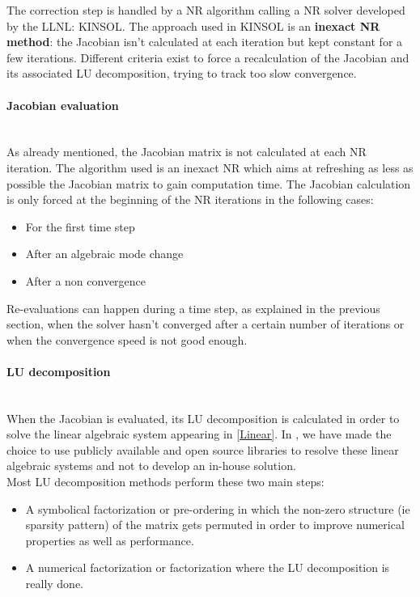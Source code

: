 \documentclass[a4paper, 12pt]{report}
\begin{document}
The correction step is handled by a \ac{NR} algorithm calling a \ac{NR} solver developed by the \ac{LLNL}: \ac{KINSOL}. The approach used in \ac{KINSOL} is an \textbf{inexact \ac{NR} method}: the Jacobian isn't calculated at each iteration but kept constant for a few iterations. Different criteria exist to force a recalculation of the Jacobian and its associated LU decomposition, trying to track too slow convergence.

\paragraph{Jacobian evaluation}
~~\\

As already mentioned, the Jacobian matrix is not calculated at each \ac{NR} iteration. The algorithm used is an inexact \ac{NR} which aims at refreshing as less as possible the Jacobian matrix to gain computation time. The Jacobian calculation is only forced at the beginning of the \ac{NR} iterations in the following cases:
\begin{itemize}
\item For the first time step
\item After an algebraic mode change
\item After a non convergence
\end{itemize}

Re-evaluations can happen during a time step, as explained in the previous section, when the solver hasn't converged after a certain number of iterations or when the convergence speed is not good enough.

\paragraph{LU decomposition}
~~\\

When the Jacobian is evaluated, its LU decomposition is calculated in order to solve the linear algebraic system appearing in \eqref{Linear}. In \Dynawo , we have made the choice to use publicly available and open source libraries to resolve these linear algebraic systems and not to develop an in-house solution. \\

Most LU decomposition methods perform these two main steps:
\begin{itemize}
\item A symbolical factorization or pre-ordering in which the non-zero structure (ie sparsity pattern) of the matrix gets permuted in order to improve numerical properties as well as performance.
\item A numerical factorization or factorization where the LU decomposition is really done.
\end{itemize}
\end{document}
